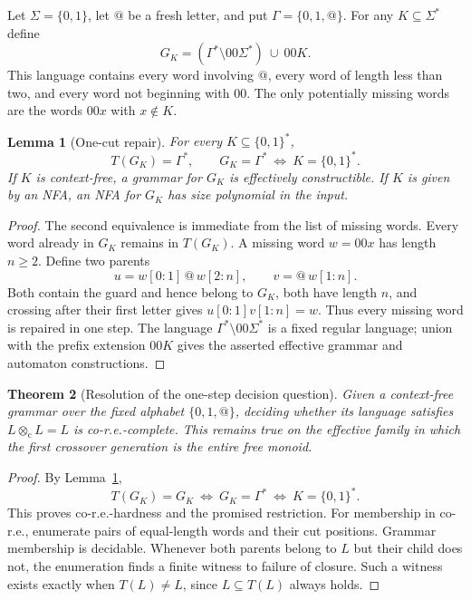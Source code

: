\documentclass[11pt,letterpaper]{article}
\makeatletter
\newtheorem{theorem}{Theorem}[section]
\newtheorem{lemma}[theorem]{Lemma}
\theoremstyle{definition}
\theoremstyle{remark}
\newcommand{\cut}{\otimes_{\mathrm c}}
\newcommand{\guard}{\mathtt{@}}
\makeatother
\begin{document}
Let $\Sigma=\{0,1\}$, let $\guard$ be a fresh letter, and put
$\Gamma=\{0,1,\guard\}$. For any $K\subseteq\Sigma^*$ define
\begin{equation}
 G_K=(\Gamma^*\setminus 00\Sigma^*)\ \cup\ 00K.
 \label{ccc:eq:guardlanguage}
\end{equation}
This language contains every word involving $\guard$, every word of length
less than two, and every word not beginning with $00$. The only potentially
missing words are the words $00x$ with $x\notin K$.

\begin{lemma}[One-cut repair]\label{ccc:lem:guard}
For every $K\subseteq\{0,1\}^*$,
\[
 T(G_K)=\Gamma^*,\qquad
 G_K=\Gamma^*\ \Longleftrightarrow\ K=\{0,1\}^*.
\]
If $K$ is context-free, a grammar for $G_K$ is effectively constructible.
If $K$ is given by an NFA, an NFA for $G_K$ has size polynomial in the input.
\end{lemma}
\begin{proof}
The second equivalence is immediate from the list of missing words. Every
word already in $G_K$ remains in $T(G_K)$. A missing word $w=00x$ has length
$n\geq2$. Define two parents
\[
 u=w[0:1]\,\guard\,w[2:n],\qquad
 v=\guard\,w[1:n].
\]
Both contain the guard and hence belong to $G_K$, both have length $n$, and
crossing after their first letter gives
$u[0:1]v[1:n]=w$. Thus every missing word is repaired in one step.
The language $\Gamma^*\setminus00\Sigma^*$ is a fixed regular language;
union with the prefix extension $00K$ gives the asserted effective grammar
and automaton constructions.
\end{proof}

\begin{theorem}[Resolution of the one-step decision question]
\label{ccc:thm:cfgclosure}
Given a context-free grammar over the fixed alphabet $\{0,1,\guard\}$,
deciding whether its language satisfies $L\cut L=L$ is co-r.e.-complete.
This remains true on the effective family in which the first crossover
generation is the entire free monoid.
\end{theorem}
\begin{proof}
By Lemma~\ref{ccc:lem:guard},
\[
 T(G_K)=G_K
 \ \Longleftrightarrow\ G_K=\Gamma^*
 \ \Longleftrightarrow\ K=\{0,1\}^*.
\]
This proves co-r.e.-hardness and the promised restriction.
For membership in co-r.e., enumerate pairs of equal-length words and their
cut positions. Grammar membership is decidable. Whenever both parents belong
to $L$ but their child does not, the enumeration finds a finite witness to
failure of closure. Such a witness exists exactly when $T(L)\ne L$, since
$L\subseteq T(L)$ always holds.
\end{proof}
\end{document}
